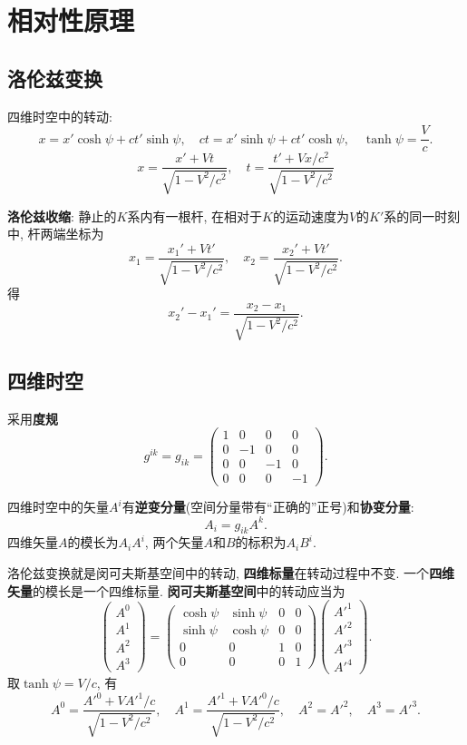 \documentclass{article}
\begin{document}
\section{相对性原理}

\subsection{洛伦兹变换}
四维时空中的转动:
\[x=x'\cosh\psi+ct'\sinh\psi,\quad ct=x'\sinh\psi+ct'\cosh\psi,\quad \tanh\psi=\frac{V}{c}.\]
\[x=\frac{x'+Vt}{\sqrt{1-V^2/c^2}},\quad t=\frac{t'+Vx/c^2}{\sqrt{1-V^2/c^2}}\]\par
\textbf{洛伦兹收缩}: 静止的$K$系内有一根杆, 在相对于$K$的运动速度为$V$的$K'$系的同一时刻中, 杆两端坐标为
\[x_1=\frac{x_1'+Vt'}{\sqrt{1-V^2/c^2}},\quad x_2=\frac{x_2'+Vt'}{\sqrt{1-V^2/c^2}}.\]
得
\[x_2'-x_1'=\frac{x_2-x_1}{\sqrt{1-V^2/c^2}}.\]\par

\subsection{四维时空}
采用\textbf{度规}
\[g^{ik}=g_{ik}=\begin{pmatrix}
1&0&0&0\\0&-1&0&0\\0&0&-1&0\\0&0&0&-1
\end{pmatrix}.\]

四维时空中的矢量$A^i$有\textbf{逆变分量}(空间分量带有“正确的”正号)和\textbf{协变分量}:
\[A_i=g_{ik}A^k.\]
四维矢量$A$的模长为$A_iA^i$, 两个矢量$A$和$B$的标积为$A_iB^i$.\par
洛伦兹变换就是闵可夫斯基空间中的转动, \textbf{四维标量}在转动过程中不变. 一个\textbf{四维矢量}的模长是一个四维标量. \textbf{闵可夫斯基空间}中的转动应当为
\[\begin{pmatrix}
A^0\\A^1\\A^2\\A^3
\end{pmatrix}
=\begin{pmatrix}
\cosh\psi&\sinh\psi&0&0\\
\sinh\psi&\cosh\psi&0&0\\
0&0&1&0\\0&0&0&1
\end{pmatrix}\begin{pmatrix}
A'^1\\A'^2\\A'^3\\A'^4
\end{pmatrix}.\]
取$\tanh\psi=V/c$, 有
\[A^0=\frac{A'^0+VA'^1/c}{\sqrt{1-V^2/c^2}},\quad A^1=\frac{A'^1+VA'^0/c}{\sqrt{1-V^2/c^2}},\quad A^2=A'^2,\quad A^3=A'^3.\]
\end{document}
